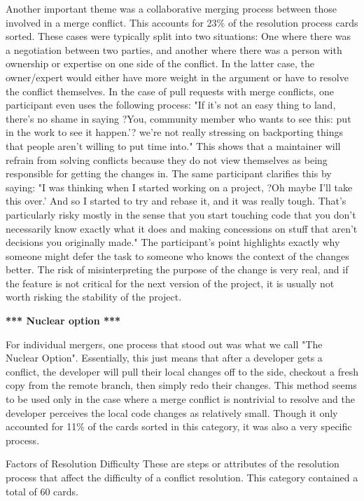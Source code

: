 Another important theme was a collaborative merging process between those involved in a merge conflict. This accounts for 23\% of the resolution process cards sorted. These cases were typically split into two situations: One where there was a negotiation between two parties, and another where there was a person with ownership or expertise on one side of the conflict. In the latter case, the owner/expert would either have more weight in the argument or have to resolve the conflict themselves. In the case of pull requests with merge conflicts, one participant even uses the following process: 
"If it's not an easy thing to land, there's no shame in saying ?You, community member who wants to see this: put in the work to see it happen.'? we're not really stressing on backporting things that people aren't willing to put time into." 
This shows that a maintainer will refrain from solving conflicts because they do not view themselves as being responsible for getting the changes in. The same participant clarifies this by saying:
"I was thinking when I started working on a project, ?Oh maybe I'll take this over.' And so I started to try and rebase it, and it was really tough. That's particularly risky mostly in the sense that you start touching code that you don't necessarily know exactly what it does and making concessions on stuff that aren't decisions you originally made."
The participant's point highlights exactly why someone might defer the task to someone who knows the context of the changes better. The risk of misinterpreting the purpose of the change is very real, and if the feature is not critical for the next version of the project, it is usually not worth risking the stability of the project.

\textbf{*** Nuclear option ***}

For individual mergers, one process that stood out was what we call "The Nuclear Option". Essentially, this just means that after a developer gets a conflict, the developer will pull their local changes off to the side, checkout a fresh copy from the remote branch, then simply redo their changes. This method seems to be used only in the case where a merge conflict is nontrivial to resolve and the developer perceives the local code changes as relatively small. Though it only accounted for 11\% of the cards sorted in this category, it was also a very specific process. 

Factors of Resolution Difficulty
These are steps or attributes of the resolution process that affect the difficulty of a conflict resolution. This category contained a total of 60 cards.

